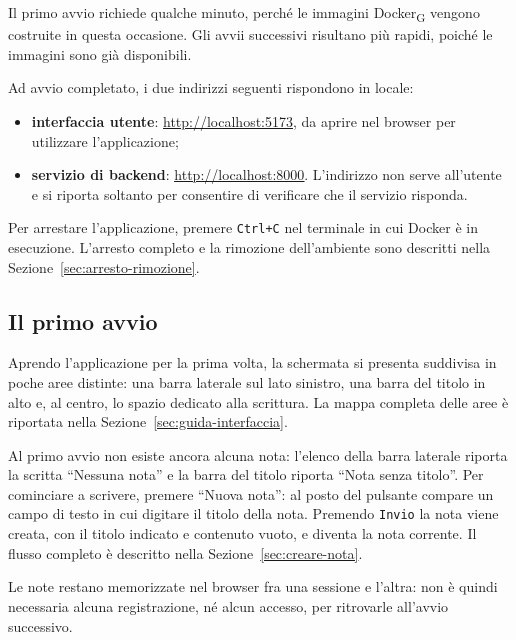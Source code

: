 \documentclass[a4paper, 10pt]{article}
\newcommand{\link}[1]{\uline{\url{#1}}}
\begin{document}

Il primo avvio richiede qualche minuto, perché le immagini Docker\textsubscript{G} vengono costruite in questa occasione. Gli avvii successivi risultano più rapidi, poiché le immagini sono già disponibili.

Ad avvio completato, i due indirizzi seguenti rispondono in locale:

\begin{itemize}
    \item \textbf{interfaccia utente}: \link{http://localhost:5173}, da aprire nel browser per utilizzare l'applicazione;

    \item \textbf{servizio di backend}: \link{http://localhost:8000}. L'indirizzo non serve all'utente e si riporta soltanto per consentire di verificare che il servizio risponda.
\end{itemize}

Per arrestare l'applicazione, premere \texttt{Ctrl+C} nel terminale in cui Docker è in esecuzione. L'arresto completo e la rimozione dell'ambiente sono descritti nella Sezione~\ref{sec:arresto-rimozione}.

\subsection{Il primo avvio}
\label{sec:primo-avvio}
Aprendo l'applicazione per la prima volta, la schermata si presenta suddivisa in poche aree distinte: una barra laterale sul lato sinistro, una barra del titolo in alto e, al centro, lo spazio dedicato alla scrittura. La mappa completa delle aree è riportata nella Sezione~\ref{sec:guida-interfaccia}.

Al primo avvio non esiste ancora alcuna nota: l'elenco della barra laterale riporta la scritta ``Nessuna nota'' e la barra del titolo riporta ``Nota senza titolo''. Per cominciare a scrivere, premere ``Nuova nota'': al posto del pulsante compare un campo di testo in cui digitare il titolo della nota. Premendo \texttt{Invio} la nota viene creata, con il titolo indicato e contenuto vuoto, e diventa la nota corrente. Il flusso completo è descritto nella Sezione~\ref{sec:creare-nota}.

Le note restano memorizzate nel browser fra una sessione e l'altra: non è quindi necessaria alcuna registrazione, né alcun accesso, per ritrovarle all'avvio successivo.
\end{document}
